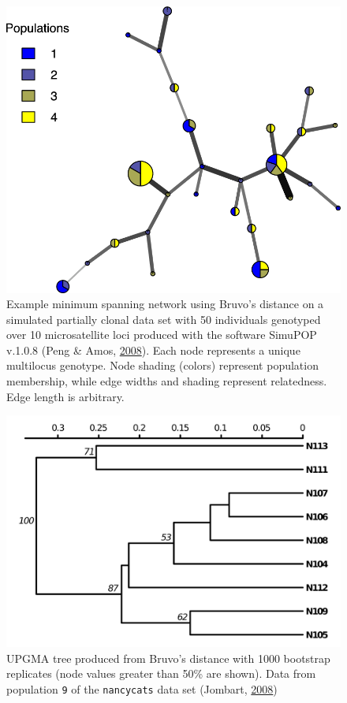 \documentclass[double,11pt]{beavtex}
\begin{document}
  \begin{figure}
  
  {\centering \includegraphics[width=0.8\linewidth]{figure/poppr/bruvo_color} 
  
  }
  
  \caption[Example minimum spanning network using Bruvo's distance on a simulated
  partially clonal data set with 50 individuals genotyped over 10 microsatellite
  loci.]{Example minimum spanning network using Bruvo's distance on a simulated
  partially clonal data set with 50 individuals genotyped over 10
  microsatellite loci produced with the software SimuPOP v.1.0.8 (Peng \&
  Amos, \protect\hyperlink{ref-peng2008forward}{2008}). Each node
  represents a unique multilocus genotype. Node shading (colors) represent
  population membership, while edge widths and shading represent
  relatedness. Edge length is arbitrary.}\label{fig:poppr3}
  \end{figure}
  
  \newpage
  
  \begin{figure}
  
  {\centering \includegraphics[width=0.8\linewidth]{figure/poppr/nancy9-boot-redo} 
  
  }
  
  \caption[UPGMA tree produced from Bruvo's distance with 1000 bootstrap
  replicates.]{UPGMA tree produced from Bruvo's distance with 1000 bootstrap replicates
  (node values greater than 50\% are shown). Data from population
  \texttt{9} of the \texttt{nancycats} data set (Jombart,
  \protect\hyperlink{ref-Jombart_2008}{2008})}\label{fig:poppr4}
  \end{figure}
  
\end{document}
